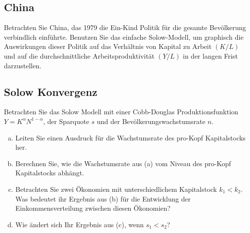 \documentclass{scrartcl}
\begin{document}
\subsection{China}
Betrachten Sie China, das 1979 die Ein-Kind Politik f\"{u}r die gesamte Bev\"{o}lkerung verbindlich einf\"{u}hrte. Benutzen Sie das einfache Solow-Modell, um graphisch die Auswirkungen dieser Politik auf das Verh\"{a}ltnis von Kapital zu Arbeit $(K/L)$ und auf die durchschnittliche Arbeitsproduktivit\"{a}t $(Y/L)$ in der langen Frist darzustellen.

\subsection{Solow Konvergenz}
Betrachten Sie das Solow Modell mit einer Cobb-Douglas Produktionsfunktion $Y=K^{\alpha}N^{1-\alpha}$, der Sparquote $s$ und der Bev\"{o}lkerungswachstumsrate $n$.
\begin{enumerate}[(a)]
  \item Leiten Sie einen Ausdruck f\"{u}r die Wachstumsrate des pro-Kopf Kapitalstocks her.
  \item Berechnen Sie, wie die Wachstumsrate aus (a) vom Niveau des pro-Kopf Kapitalstocks abh\"{a}ngt.
  \item Betrachten Sie zwei \"{O}konomien mit unterschiedlichem Kapitalstock $k_1<k_2$. Was bedeutet ihr Ergebnis aus (b) f\"{u}r die Entwicklung der Einkommensverteilung zwischen diesen \"{O}konomien?
  \item Wie \"{a}ndert sich Ihr Ergebnis aus (c), wenn $s_1<s_2$?
\end{enumerate}
\end{document}
